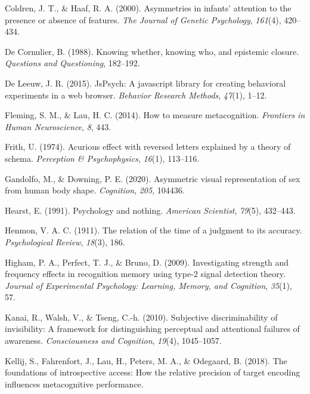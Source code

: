 \documentclass[
  english,
  man,floatsintext]{apa6}
\begin{document}
\leavevmode\hypertarget{ref-coldren2000asymmetries}{}%
Coldren, J. T., \& Haaf, R. A. (2000). Asymmetries in infants' attention to the presence or absence of features. \emph{The Journal of Genetic Psychology}, \emph{161}(4), 420--434.

\leavevmode\hypertarget{ref-de1988knowing}{}%
De Cornulier, B. (1988). Knowing whether, knowing who, and epistemic closure. \emph{Questions and Questioning}, 182--192.

\leavevmode\hypertarget{ref-de2015jspsych}{}%
De Leeuw, J. R. (2015). JsPsych: A javascript library for creating behavioral experiments in a web browser. \emph{Behavior Research Methods}, \emph{47}(1), 1--12.

\leavevmode\hypertarget{ref-fleming2014measure}{}%
Fleming, S. M., \& Lau, H. C. (2014). How to measure metacognition. \emph{Frontiers in Human Neuroscience}, \emph{8}, 443.

\leavevmode\hypertarget{ref-frith1974acurious}{}%
Frith, U. (1974). Acurious effect with reversed letters explained by a theory of schema. \emph{Perception \& Psychophysics}, \emph{16}(1), 113--116.

\leavevmode\hypertarget{ref-gandolfo2020asymmetric}{}%
Gandolfo, M., \& Downing, P. E. (2020). Asymmetric visual representation of sex from human body shape. \emph{Cognition}, \emph{205}, 104436.

\leavevmode\hypertarget{ref-hearst1991psychology}{}%
Hearst, E. (1991). Psychology and nothing. \emph{American Scientist}, \emph{79}(5), 432--443.

\leavevmode\hypertarget{ref-henmon1911relation}{}%
Henmon, V. A. C. (1911). The relation of the time of a judgment to its accuracy. \emph{Psychological Review}, \emph{18}(3), 186.

\leavevmode\hypertarget{ref-higham2009investigating}{}%
Higham, P. A., Perfect, T. J., \& Bruno, D. (2009). Investigating strength and frequency effects in recognition memory using type-2 signal detection theory. \emph{Journal of Experimental Psychology: Learning, Memory, and Cognition}, \emph{35}(1), 57.

\leavevmode\hypertarget{ref-kanai2010subjective}{}%
Kanai, R., Walsh, V., \& Tseng, C.-h. (2010). Subjective discriminability of invisibility: A framework for distinguishing perceptual and attentional failures of awareness. \emph{Consciousness and Cognition}, \emph{19}(4), 1045--1057.

\leavevmode\hypertarget{ref-kellij2018foundations}{}%
Kellij, S., Fahrenfort, J., Lau, H., Peters, M. A., \& Odegaard, B. (2018). The foundations of introspective access: How the relative precision of target encoding influences metacognitive performance.
\end{document}
